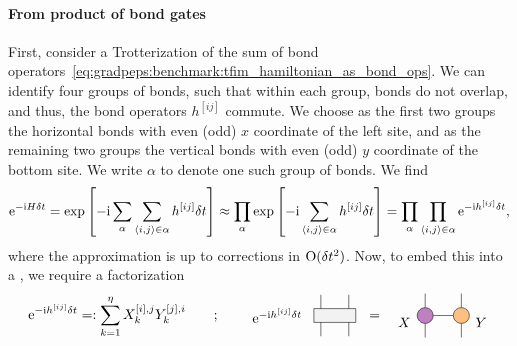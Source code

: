 \paragraph{From product of bond gates}
First, consider a Trotterization of the sum of bond operators~\eqref{eq:gradpeps:benchmark:tfim_hamiltonian_as_bond_ops}.
%
We can identify four groups of bonds, such that within each group, bonds do not overlap, and thus, the bond operators $h^{[ij]}$ commute.
%
We choose as the first two groups the horizontal bonds with even (odd) $x$ coordinate of the left site, and as the remaining two groups the vertical bonds with even (odd) $y$ coordinate of the bottom site.
%
We write $\alpha$ to denote one such group of bonds.
%
We find
\begin{equation}
    \label{eq:gradpeps:tfim:evolution_op_bond_trotterization}
    \eto{-\im H \delta t}
    = \exp\sBr{-\im \sum_\alpha \sum_{\langle i, j \rangle \in \alpha} h^{[ij]} \delta t}
    \approx \prod_\alpha \exp\sBr{-\im \sum_{\langle i, j \rangle \in \alpha} h^{[ij]} \delta t}
    = \prod_\alpha \prod_{\langle i, j \rangle \in \alpha} \eto{-\im h^{[ij]} \delta t}
    ,
\end{equation}
where the approximation is up to corrections in $\mathrm{O}(\delta t^2)$.
%
Now, to embed this into a , we require a factorization 
\begin{equation}
    \eto{-\im h^{[ij]} \delta t}
    =: \sum_{k=1}^\eta X^{[i],j}_k Y^{[j],i}_k
    \qquad;\qquad
    \vcenter{\hbox{\begin{tikzpicture}
        \node[left] at (-5pt,5pt) {$\eto{-\im h^{[ij]} \delta t}$};
        \draw[draw, fill=gray!10] (0pt,0pt) rectangle (30pt,10pt);
        \draw (5pt,0pt) -- ++(0,-10pt);
        \draw (5pt,10pt) -- ++(0,10pt);
        \draw (25pt,0pt) -- ++(0,-10pt);
        \draw (25pt,10pt) -- ++(0,10pt);
    \end{tikzpicture}}}
    ~~ = ~~
    \vcenter{\hbox{\begin{tikzpicture}[
            xt/.style={circle, draw, fill=violet!50, inner sep=0, minimum width=.4cm, minimum height=.4cm},
            yt/.style={circle, draw, fill=orange!50, inner sep=0, minimum width=.4cm, minimum height=.4cm},
        ]
        \node[xt] (X) at (0pt,0pt) {};
        \draw (X) -- ++(20pt,0) node[yt, right] (Y) {};
        \draw (X.south) -- ++(0,-10pt) (Y.south) -- ++(0,-10pt);
        \draw (X.north) -- ++(0,10pt) (Y.north) -- ++(0,10pt);
        \node at (-15pt,-5pt) {$X$};
        \node at (40pt,-5pt) {$Y$};
    \end{tikzpicture}}}
\end{equation}
